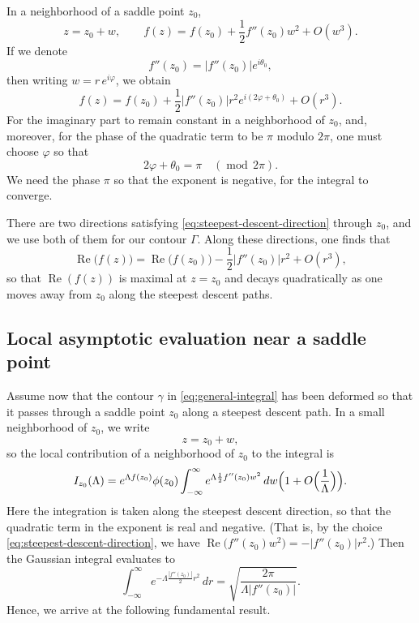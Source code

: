\documentclass[letterpaper,11pt,oneside,reqno]{article}
\numberwithin{equation}{section}
\theoremstyle{definition}
\begin{document}
In a neighborhood of a saddle point $z_0$,
\[
	z=z_0+w,
	\qquad
	f(z)=f(z_0)+\frac{1}{2}f''(z_0)w^2 + O(w^3).
\]
If we denote
\[
	f''(z_0)=|f''(z_0)|e^{i\theta_0},
\]
then writing $w=r\,e^{i\varphi}$, we obtain
\[
	f(z)=f(z_0)+\frac{1}{2}|f''(z_0)|r^2e^{i(2\varphi+\theta_0)}+O(r^3).
\]
For the imaginary part to remain constant in a neighborhood
of $z_0$, and, moreover,
for the phase of the quadratic term to be $\pi$ modulo $2\pi$, one must choose $\varphi$ so that
\begin{equation}
	\label{eq:steepest-descent-direction}
	2\varphi+\theta_0=\pi \quad (\operatorname{mod}\,2\pi).
\end{equation}
We need the phase $\pi$ so that the exponent is negative, for the integral to converge.

There are two directions satisfying \eqref{eq:steepest-descent-direction}
through $z_0$, and we use both of them for our contour $\Gamma$.
Along these directions, one finds that
\[
	\operatorname{Re}\bigl(f(z)\bigr)=\operatorname{Re}\bigl(f(z_0)\bigr)-\frac{1}{2}|f''(z_0)|r^2+O(r^3),
\]
so that $\operatorname{Re}(f(z))$ is maximal at $z=z_0$ and decays quadratically as one moves away from $z_0$ along the steepest descent paths.

\subsection{Local asymptotic evaluation near a saddle point}

Assume now that the contour $\gamma$ in \eqref{eq:general-integral} has been deformed so that it passes through a saddle point $z_0$ along a steepest descent path. In a small neighborhood of $z_0$, we write
\[
	z=z_0+w,
\]
so the local contribution of a neighborhood of $z_0$ to the integral is
\begin{equation}
	\label{eq:local-contribution}
	I_{z_0}(\Lambda)=e^{\Lambda f(z_0)}\phi(z_0)
	\int_{-\infty}^{\infty} e^{\Lambda\frac{1}{2}f''(z_0)w^2}\,dw
	\Bigl(1+O\Bigl(\frac{1}{\Lambda}\Bigr)\Bigr).
\end{equation}
Here the integration is taken along the steepest descent direction, so that the quadratic term in the exponent is real and negative. (That is, by the choice \eqref{eq:steepest-descent-direction}, we have $\operatorname{Re}\bigl(f''(z_0)w^2\bigr)=-|f''(z_0)|r^2$.) Then the Gaussian integral evaluates to
\[
	\int_{-\infty}^{\infty} e^{-\Lambda\frac{|f''(z_0)|}{2}r^2}\,dr
	=\sqrt{\frac{2\pi}{\Lambda |f''(z_0)|}}.
\]
Hence, we
arrive at the following fundamental result.
\end{document}
